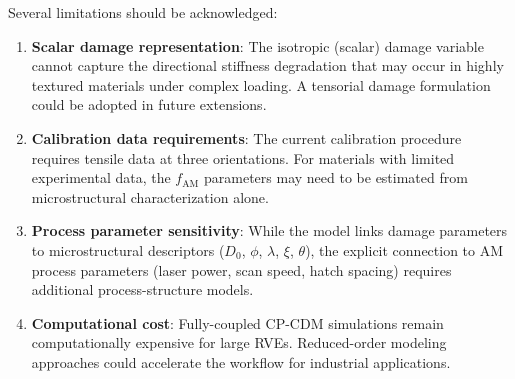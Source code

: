 \documentclass[12pt,a4paper,twocolumn]{article}
\begin{document}
Several limitations should be acknowledged:

\begin{enumerate}\def\labelenumi{(\arabic{enumi})}
    \item \textbf{Scalar damage representation}: The isotropic (scalar) damage variable cannot capture the directional stiffness degradation that may occur in highly textured materials under complex loading. A tensorial damage formulation \cite{chaboche1988continuum,murakami1988mechanical} could be adopted in future extensions.
    
    \item \textbf{Calibration data requirements}: The current calibration procedure requires tensile data at three orientations. For materials with limited experimental data, the $f_{\text{AM}}$ parameters may need to be estimated from microstructural characterization alone.
    
    \item \textbf{Process parameter sensitivity}: While the model links damage parameters to microstructural descriptors ($D_0$, $\phi$, $\lambda$, $\xi$, $\theta$), the explicit connection to AM process parameters (laser power, scan speed, hatch spacing) requires additional process-structure models.
    
    \item \textbf{Computational cost}: Fully-coupled CP-CDM simulations remain computationally expensive for large RVEs. Reduced-order modeling approaches \cite{zhang2021modeling} could accelerate the workflow for industrial applications.
    

\end{enumerate}
\end{document}
